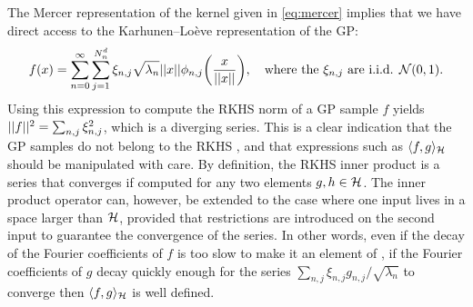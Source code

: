 The Mercer representation of the kernel given in \cref{eq:mercer} implies that we have direct access to the Karhunen–Lo\`eve representation of the GP:
\begin{equation}
\label{eq:karhunen-loeve-2}
    f(x) =  \sum_{n=0}^\infty \sum_{j=1}^{\dnumharmonicsforlevel}  \xi_{n,j} \sqrt{\lambda_n} \norm{x} \phi_{n, j}\left(\frac{x}{\norm{x}}\right), \text{\quad where the } \xi_{n,j} \text{ are i.i.d. } \mathcal{N}(0, 1).
\end{equation}
Using this expression to compute the RKHS norm of a GP sample $f$ yields $\lvert\lvert f\rvert\rvert^2 = \sum_{n, j} \xi_{n,j}^2$, which is a diverging series. This is a clear indication that the GP samples do not belong to the RKHS \citep{kanagawa2018gaussian}, and that expressions such as $\langle f, g \rangle_{{\mathcal{H}}}$ should be manipulated with care. By definition, the RKHS inner product is a series that converges if computed for any two elements  $g, h \in {\mathcal{H}}$. The inner product operator can, however, be extended to the case where one input lives in a space larger than ${\mathcal{H}}$, provided that restrictions are introduced on the second input to guarantee the convergence of the series. In other words, even if the decay of the Fourier coefficients of $f$ is too slow to make it an element of \rkhs, if the Fourier coefficients of $g$ decay quickly enough for the series $\sum_{n,j} \xi_{n,j} g_{n,j}/ \sqrt{\lambda_n}$ to converge then $\langle f, g \rangle_{{\mathcal{H}}}$ is well defined.

